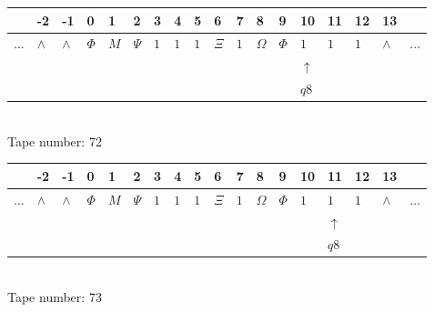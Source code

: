 \documentclass[11pt]{article}
\begin{document}
\begin{table}[H]
\centering
\begin{tabular}{llllllllllllllllll}
 & -2 & -1 & 0 & 1 & 2 & 3 & 4 & 5 & 6 & 7 & 8 & 9 & 10 & 11 & 12 & 13 & \\
\hline
$...$ & \multicolumn{1}{|l|}{$\wedge$} & \multicolumn{1}{|l|}{$\wedge$} & \multicolumn{1}{|l|}{$\Phi$} & \multicolumn{1}{|l|}{$M$} & \multicolumn{1}{|l|}{$\Psi$} & \multicolumn{1}{|l|}{$1$} & \multicolumn{1}{|l|}{$1$} & \multicolumn{1}{|l|}{$1$} & \multicolumn{1}{|l|}{$\Xi$} & \multicolumn{1}{|l|}{$1$} & \multicolumn{1}{|l|}{$\Omega$} & \multicolumn{1}{|l|}{$\Phi$} & \multicolumn{1}{|l|}{$1$} & \multicolumn{1}{|l|}{$1$} & \multicolumn{1}{|l|}{$1$} & \multicolumn{1}{|l|}{$\wedge$} & $...$\\
\hline
&  &  &  &  &  &  &  &  &  &  &  &  & $\uparrow$ &  &  &  &  \\
&  &  &  &  &  &  &  &  &  &  &  &  & $ q8 $ &  &  &  &  \\
\end{tabular}
\\
Tape number: 72
\noindent\makebox[\linewidth]{\hdashrule{\textwidth}{1pt}{1pt}}\end{table}

\begin{table}[H]
\centering
\begin{tabular}{llllllllllllllllll}
 & -2 & -1 & 0 & 1 & 2 & 3 & 4 & 5 & 6 & 7 & 8 & 9 & 10 & 11 & 12 & 13 & \\
\hline
$...$ & \multicolumn{1}{|l|}{$\wedge$} & \multicolumn{1}{|l|}{$\wedge$} & \multicolumn{1}{|l|}{$\Phi$} & \multicolumn{1}{|l|}{$M$} & \multicolumn{1}{|l|}{$\Psi$} & \multicolumn{1}{|l|}{$1$} & \multicolumn{1}{|l|}{$1$} & \multicolumn{1}{|l|}{$1$} & \multicolumn{1}{|l|}{$\Xi$} & \multicolumn{1}{|l|}{$1$} & \multicolumn{1}{|l|}{$\Omega$} & \multicolumn{1}{|l|}{$\Phi$} & \multicolumn{1}{|l|}{$1$} & \multicolumn{1}{|l|}{$1$} & \multicolumn{1}{|l|}{$1$} & \multicolumn{1}{|l|}{$\wedge$} & $...$\\
\hline
&  &  &  &  &  &  &  &  &  &  &  &  &  & $\uparrow$ &  &  &  \\
&  &  &  &  &  &  &  &  &  &  &  &  &  & $ q8 $ &  &  &  \\
\end{tabular}
\\
Tape number: 73
\noindent\makebox[\linewidth]{\hdashrule{\textwidth}{1pt}{1pt}}\end{table}
\end{document}
